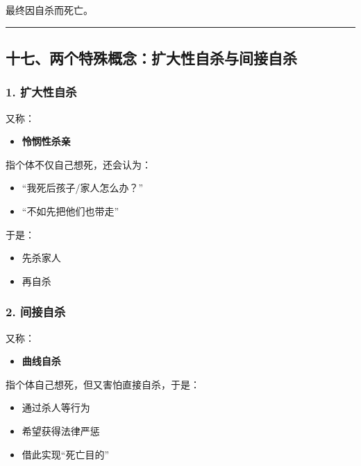\documentclass[
  chinese,
  9pt,
  a4paper,
]{ctexart}
\providecommand{\tightlist}{%
  \setlength{\itemsep}{0pt}\setlength{\parskip}{0pt}}
\begin{document}
最终因自杀而死亡。

\begin{center}\rule{0.5\linewidth}{0.5pt}\end{center}

\subsection{十七、两个特殊概念：扩大性自杀与间接自杀}\label{ux5341ux4e03ux4e24ux4e2aux7279ux6b8aux6982ux5ff5ux6269ux5927ux6027ux81eaux6740ux4e0eux95f4ux63a5ux81eaux6740}

\subsubsection{1. 扩大性自杀}\label{ux6269ux5927ux6027ux81eaux6740}

又称：

\begin{itemize}
\tightlist
\item
  \textbf{怜悯性杀亲}
\end{itemize}

指个体不仅自己想死，还会认为：

\begin{itemize}
\tightlist
\item
  ``我死后孩子/家人怎么办？''
\item
  ``不如先把他们也带走''
\end{itemize}

于是：

\begin{itemize}
\tightlist
\item
  先杀家人
\item
  再自杀
\end{itemize}

\subsubsection{2. 间接自杀}\label{ux95f4ux63a5ux81eaux6740}

又称：

\begin{itemize}
\tightlist
\item
  \textbf{曲线自杀}
\end{itemize}

指个体自己想死，但又害怕直接自杀，于是：

\begin{itemize}
\tightlist
\item
  通过杀人等行为
\item
  希望获得法律严惩
\item
  借此实现``死亡目的''
\end{itemize}
\end{document}
